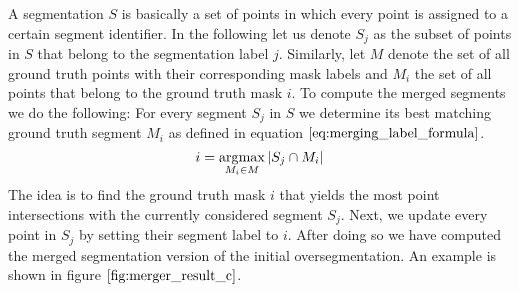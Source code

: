 A segmentation $S$ is basically a set of points in which every point is assigned to a certain segment identifier. In the following let us denote $S_j$ as the subset of points in $S$ that belong to the segmentation label $j$. Similarly, let $M$ denote the set of all ground truth points with their corresponding mask labels and $M_i$ the set of all points that belong to the ground truth mask $i$. To compute the merged segments we do the following: For every segment $S_j$ in $S$ we determine its best matching ground truth segment $M_i$ as defined in equation $\ref{eq:merging_label_formula}$. 
\begin{equation}
i = \operatorname*{\arg\!\max}\limits_{M_i \in M} \left\vert{S_j \cap M_i}\right\vert
\label{eq:merging_label_formula}
\end{equation}
The idea is to find the ground truth mask $i$ that yields the most point intersections with the currently considered segment $S_j$. Next, we update every point in $S_j$ by setting their segment label to $i$. After doing so we have computed the merged segmentation version of the initial oversegmentation. An example is shown in figure $\ref{fig:merger_result_c}$.



